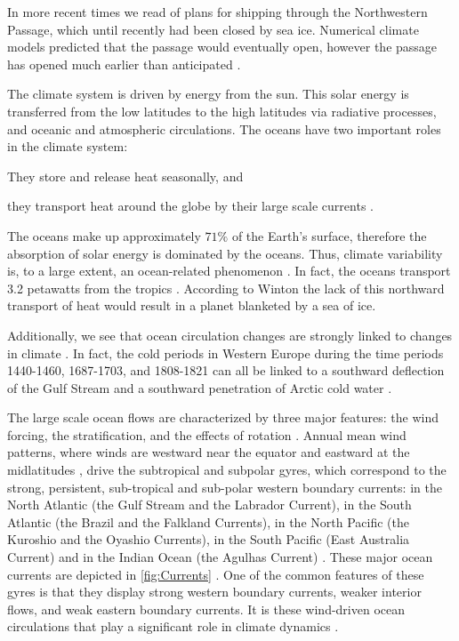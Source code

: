 In more recent times we read of plans for shipping through the Northwestern
Passage, which until recently had been closed by sea ice. Numerical climate
models predicted that the passage would eventually open, however the passage has
opened much earlier than anticipated \cite{NatGeo}.

The climate system is driven by energy from the sun. This solar energy is
transferred from the low latitudes to the high latitudes via radiative processes,
and oceanic and atmospheric circulations. The oceans have two important roles in
the climate system: \begin{inparaenum}[1)]\item They store and release heat
seasonally, and \item they transport heat around the globe by their large scale
currents \cite{Winton2003}. \end{inparaenum}  The oceans make up approximately
$71\%$ of the Earth's surface, therefore the absorption of solar energy is
dominated by the oceans.  Thus, climate variability is, to a large extent, an
ocean-related phenomenon \cite{Siedler01}. In fact, the oceans transport 3.2
petawatts from the tropics \cite{Trenberth2001}. According to Winton
\cite{Winton2003} the lack of this northward transport of heat would result in
a planet blanketed by a sea of ice.

Additionally, we see that ocean circulation changes are strongly linked to
changes in climate \cite{Morner95, Siedler01}. In fact, the cold periods in
Western Europe during the time periods 1440-1460, 1687-1703, and 1808-1821 can
all be linked to a southward deflection of the Gulf Stream and a southward
penetration of Arctic cold water \cite{Morner95}.

The large scale ocean flows are characterized by three major features: the wind
forcing, the stratification, and the effects of rotation \cite{Majda, Vallis06}.
Annual mean wind patterns, where winds are westward near the equator and
eastward at the midlatitudes \cite{Dijkstra08}, drive the subtropical and
subpolar gyres, which correspond to the strong, persistent, sub-tropical and
sub-polar western boundary currents: in the North Atlantic (the Gulf Stream and
the Labrador Current), in the South Atlantic (the Brazil and the Falkland
Currents), in the North Pacific (the Kuroshio and the Oyashio Currents), in the
South Pacific (East Australia Current) and in the Indian Ocean (the Agulhas
Current) \cite{Dijkstra08,Vallis06}. These major ocean currents are depicted in
\autoref{fig:Currents} \cite{Haidvogel1999}. One of the common features of these
gyres is that they display strong western boundary currents, weaker interior
flows, and weak eastern boundary currents. It is these wind-driven ocean
circulations that play a significant role in climate dynamics
\cite{Beesley2008,Dijkstra05,Ekman1905,Ghil08}.

